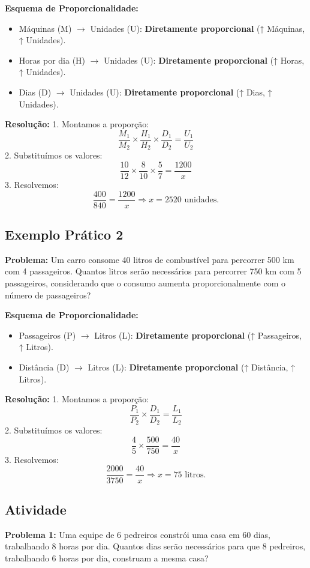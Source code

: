 \documentclass[12pt]{article}
\begin{document}
\begin{multicols}{2}
\textbf{Esquema de Proporcionalidade:}
\begin{itemize}
    \item Máquinas (M) $\rightarrow$ Unidades (U): \textbf{Diretamente proporcional} (↑ Máquinas, ↑ Unidades).
    \item Horas por dia (H) $\rightarrow$ Unidades (U): \textbf{Diretamente proporcional} (↑ Horas, ↑ Unidades).
    \item Dias (D) $\rightarrow$ Unidades (U): \textbf{Diretamente proporcional} (↑ Dias, ↑ Unidades).
\end{itemize}

\textbf{Resolução:}
1. Montamos a proporção:
\[
\frac{M_1}{M_2} \times \frac{H_1}{H_2} \times \frac{D_1}{D_2} = \frac{U_1}{U_2}
\]
2. Substituímos os valores:
\[
\frac{10}{12} \times \frac{8}{10} \times \frac{5}{7} = \frac{1200}{x}
\]
3. Resolvemos:
\[
\frac{400}{840} = \frac{1200}{x} \Rightarrow x = 2520 \text{ unidades.}
\]

\subsection*{Exemplo Prático 2}
\textbf{Problema:} Um carro consome 40 litros de combustível para percorrer 500 km com 4 passageiros. Quantos litros serão necessários para percorrer 750 km com 5 passageiros, considerando que o consumo aumenta proporcionalmente com o número de passageiros?

\textbf{Esquema de Proporcionalidade:}
\begin{itemize}
    \item Passageiros (P) $\rightarrow$ Litros (L): \textbf{Diretamente proporcional} (↑ Passageiros, ↑ Litros).
        \newline

    \item Distância (D) $\rightarrow$ Litros (L): \textbf{Diretamente proporcional} (↑ Distância, ↑ Litros).
\end{itemize}

\textbf{Resolução:}
1. Montamos a proporção:
\[
\frac{P_1}{P_2} \times \frac{D_1}{D_2} = \frac{L_1}{L_2}
\]
2. Substituímos os valores:
\[
\frac{4}{5} \times \frac{500}{750} = \frac{40}{x}
\]
3. Resolvemos:
\[
\frac{2000}{3750} = \frac{40}{x} \Rightarrow x = 75 \text{ litros.}
\]

\subsection*{Atividade}
\textbf{Problema 1:} Uma equipe de 6 pedreiros constrói uma casa em 60 dias, trabalhando 8 horas por dia. Quantos dias serão necessários para que 8 pedreiros, trabalhando 6 horas por dia, construam a mesma casa?


\end{multicols}
\end{document}
